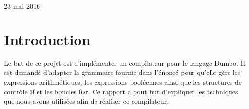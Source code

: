 \documentclass[a4paper,10pt]{article}
\begin{document}
\begin{titlepage}

{\large 23 mai 2016}\\[3cm] %


 

\vfill %

\end{titlepage}

\newpage
\tableofcontents
\newpage

\section{Introduction}

Le but de ce projet est d'implémenter un compilateur pour le langage \textrm{Dumbo}. Il est demandé d'adapter la grammaire fournie dans l'énoncé pour 
qu'elle gère les expressions arithmétiques, les expressions booléennes ainsi que les structures de contrôle \textbf{if} et les boucles \textbf{for}.
Ce rapport a pout but d'expliquer les techniques que nous avons utilisées afin de réaliser ce compilateur.
\end{document}
